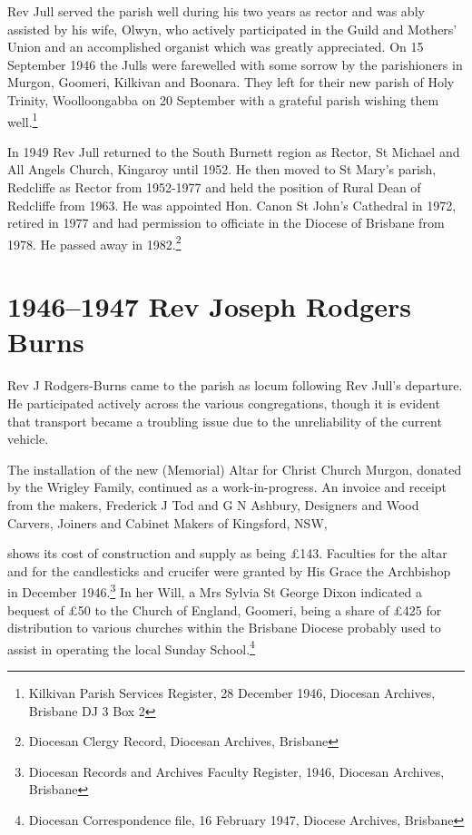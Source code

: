 Rev Jull served the parish well during his two years as rector and was ably assisted by his wife, Olwyn, who actively participated in the Guild and Mothers' Union and an accomplished organist which was greatly appreciated. On 15 September 1946 the Julls were farewelled with some sorrow by the parishioners in Murgon, Goomeri, Kilkivan and Boonara. They left for their new parish of Holy Trinity, Woolloongabba on 20 September with a grateful parish wishing them well.\footnote{Kilkivan Parish Services Register, 28 December 1946, Diocesan Archives, Brisbane DJ 3 Box 2}


In 1949 Rev Jull returned to the South Burnett region as Rector, St Michael and All Angels Church, Kingaroy until 1952. He then moved to St Mary's parish, Redcliffe as Rector from 1952-1977 and held the position of Rural Dean of Redcliffe from 1963. He was appointed Hon. Canon St John's Cathedral in 1972, retired in 1977 and had permission to officiate in the Diocese of Brisbane from 1978. He passed away in 1982.\footnote{Diocesan Clergy Record, Diocesan Archives, Brisbane}


\section{1946--1947 Rev Joseph Rodgers Burns}



Rev J Rodgers-Burns came to the parish as locum following Rev Jull's departure. He participated actively across the various congregations, though it is evident that transport became a troubling issue due to the unreliability of the current vehicle.



The installation of the new (Memorial) Altar for Christ Church Murgon, donated by the Wrigley Family, continued as a work-in-progress. An invoice and receipt from the makers, Frederick J Tod and G N Ashbury, Designers and Wood Carvers, Joiners and Cabinet Makers of Kingsford, NSW,



shows its cost of construction and supply as being \pounds143. Faculties for the altar and for the candlesticks and crucifer were granted by His Grace the Archbishop in December 1946.\footnote{Diocesan Records and Archives Faculty Register, 1946, Diocesan Archives, Brisbane} In her Will, a Mrs Sylvia St George Dixon indicated a bequest of \pounds50 to the Church of England, Goomeri, being a share of \pounds425 for distribution to various churches within the Brisbane Diocese probably used to assist in operating the local Sunday School.\footnote{Diocesan Correspondence file, 16 February 1947, Diocese Archives, Brisbane}








